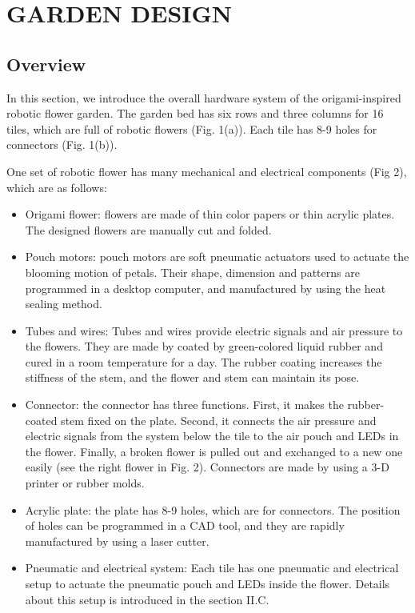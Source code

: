 \documentclass[letterpaper, 10 pt, conference]{ieeeconf}  %
\begin{document}
\section{GARDEN DESIGN}

\subsection{Overview}

In this section, we introduce the overall hardware system of the origami-inspired robotic flower garden. The garden bed has six rows and three columns for 16 tiles, which are full of robotic flowers (Fig. 1(a)). Each tile has 8-9 holes for connectors (Fig. 1(b)).

One set of robotic flower has many mechanical and electrical components (Fig 2), which are as follows:

\begin{itemize}
	\item Origami flower: flowers are made of thin color papers or thin acrylic plates. The designed flowers are manually cut and folded.
	\item Pouch motors: pouch motors are soft pneumatic actuators used to actuate the blooming motion of petals. Their shape, dimension and patterns are programmed in a desktop computer, and manufactured by using the heat sealing method\cite{NiiyamaICRA2014}.
	\item Tubes and wires: Tubes and wires provide electric signals and air pressure to the flowers. They are made by coated by green-colored liquid rubber and cured in a room temperature for a day. The rubber coating increases the stiffness of the stem, and the flower and stem can maintain its pose. 
	\item Connector: the connector has three functions. First, it makes the rubber-coated stem fixed on the plate. Second, it connects the air pressure and electric signals from the system below the tile to the air pouch and LEDs in the flower. Finally, a broken flower is pulled out and exchanged to a new one easily (see the right flower in Fig. 2). Connectors are made by using a 3-D printer or rubber molds.  
	\item Acrylic plate: the plate has 8-9 holes, which are for connectors. The position of holes can be programmed in a CAD tool, and they are rapidly manufactured by using a laser cutter.
	\item Pneumatic and electrical system: Each tile has one pneumatic and electrical setup to actuate the pneumatic pouch and LEDs inside the flower. Details about this setup is introduced in the section II.C.  
\end{itemize}
\end{document}
